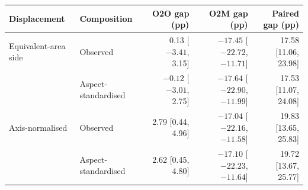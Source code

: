 \begin{tabular}{@{}llrrr@{}}
\toprule
Displacement & Composition & O2O gap (pp) & O2M gap (pp) & Paired gap (pp) \\
\midrule
Equivalent-area side & Observed & 0.13 [$-3.41$, 3.15] & $-17.45$ [$-22.72$, $-11.71$] & 17.58 [11.06, 23.98] \\
 & Aspect-standardised & $-0.12$ [$-3.01$, 2.75] & $-17.64$ [$-22.90$, $-11.99$] & 17.53 [11.07, 24.08] \\
Axis-normalised & Observed & 2.79 [0.44, 4.96] & $-17.04$ [$-22.16$, $-11.58$] & 19.83 [13.65, 25.83] \\
 & Aspect-standardised & 2.62 [0.45, 4.80] & $-17.10$ [$-22.23$, $-11.64$] & 19.72 [13.67, 25.77] \\
\bottomrule
\end{tabular}
